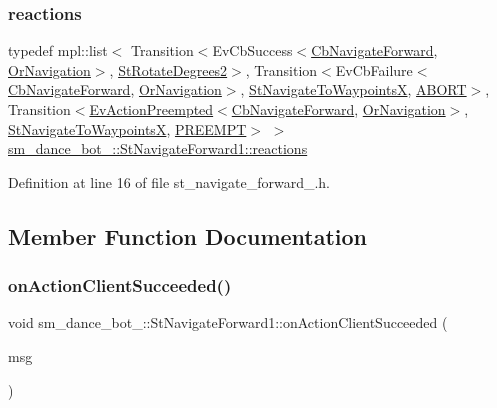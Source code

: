 \subsubsection{\texorpdfstring{reactions}{reactions}}
{\footnotesize\ttfamily typedef mpl\+::list$<$ Transition$<$Ev\+Cb\+Success$<$\hyperlink{classcl__move__base__z_1_1CbNavigateForward}{Cb\+Navigate\+Forward}, \hyperlink{classsm__dance__bot__2_1_1OrNavigation}{Or\+Navigation}$>$, \hyperlink{structsm__dance__bot__2_1_1StRotateDegrees2}{St\+Rotate\+Degrees2}$>$, Transition$<$Ev\+Cb\+Failure$<$\hyperlink{classcl__move__base__z_1_1CbNavigateForward}{Cb\+Navigate\+Forward}, \hyperlink{classsm__dance__bot__2_1_1OrNavigation}{Or\+Navigation}$>$, \hyperlink{structsm__dance__bot__2_1_1StNavigateToWaypointsX}{St\+Navigate\+To\+WaypointsX}, \hyperlink{structsmacc_1_1default__transition__tags_1_1ABORT}{A\+B\+O\+RT}$>$, Transition$<$\hyperlink{structsmacc_1_1default__events_1_1EvActionPreempted}{Ev\+Action\+Preempted}$<$\hyperlink{classcl__move__base__z_1_1CbNavigateForward}{Cb\+Navigate\+Forward}, \hyperlink{classsm__dance__bot__2_1_1OrNavigation}{Or\+Navigation}$>$, \hyperlink{structsm__dance__bot__2_1_1StNavigateToWaypointsX}{St\+Navigate\+To\+WaypointsX}, \hyperlink{structsmacc_1_1default__transition__tags_1_1PREEMPT}{P\+R\+E\+E\+M\+PT}$>$ $>$ \hyperlink{structsm__dance__bot__2_1_1StNavigateForward1_ad3a42f210e6afa69c006cf9c06329297}{sm\+\_\+dance\+\_\+bot\+\_\+::\+St\+Navigate\+Forward1\+::reactions}}



Definition at line 16 of file st\+\_\+navigate\+\_\+forward\+\_.\+h.



\subsection{Member Function Documentation}
\mbox{\label{structsm__dance__bot__2_1_1StNavigateForward1_a6ca4d488672e844032a5ddd3a14d5942}} 
\subsubsection{\texorpdfstring{on\+Action\+Client\+Succeeded()}{onActionClientSucceeded()}}
{\footnotesize\ttfamily void sm\+\_\+dance\+\_\+bot\+\_\+::\+St\+Navigate\+Forward1\+::on\+Action\+Client\+Succeeded (\begin{DoxyParamCaption}\item[{\hyperlink{classcl__move__base__z_1_1ClMoveBaseZ_a99373d0c15ae96684462d8677f5fd632}{Cl\+Move\+Base\+Z\+::\+Result\+Const\+Ptr} \&}]{msg }\end{DoxyParamCaption})\hspace{0.3cm}{\ttfamily [inline]}}



